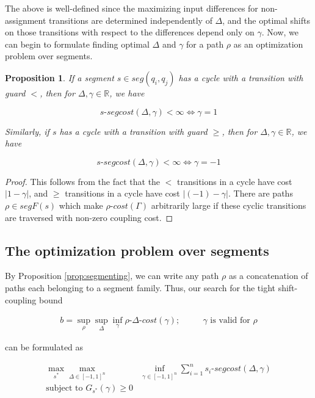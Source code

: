 \documentclass{article}
\newcommand{\R}{\mathbb{R}}
\newtheorem{proposition}{Proposition}[section]
\newcommand{\1}{\langle 1 \rangle}
\newcommand{\2}{\langle 2 \rangle}
\begin{document}
The above is well-defined since the maximizing input differences for non-assignment transitions are determined independently of $\Delta$, and the optimal shifts on those transitions with respect to the differences depend only on $\gamma$. Now, we can begin to formulate finding optimal $\Delta$ and $\gamma$ for a path $\rho$ as an optimization problem over segments.

\begin{proposition}
    If a segment $s \in seg(q_i, q_j)$ has a cycle with a transition with guard $<$, then for $\Delta, \gamma \in \R$, we have 

    \[s\text{-}segcost(\Delta, \gamma) < \infty \iff \gamma = 1 \]

    Similarly, if $s$ has a cycle with a transition with guard $\geq$, then for $\Delta, \gamma \in \R$, we have

    \[s\text{-}segcost(\Delta, \gamma) < \infty \iff \gamma = -1\]
\end{proposition}

\begin{proof}
    This follows from the fact that the $<$ transitions in a cycle have cost $|1 - \gamma|$, and $\geq$ transitions in a cycle have cost $|(-1) - \gamma|$. There are paths $\rho \in segF(s)$ which make $\rho$-$cost(\Gamma)$ arbitrarily large if these cyclic transitions are traversed with non-zero coupling cost.
\end{proof}

\subsection{The optimization problem over segments}

By Proposition \ref{prop:segmenting}, we can write any path $\rho$ as a concatenation of paths each belonging to a segment family. Thus, our search for the tight shift-coupling bound

\begin{align*}
    b = \sup_{\rho} \sup_{\Delta} \inf_{\gamma} \rho\text{-}\Delta\text{-}cost(\gamma) ; \qquad \text{ $\gamma$ is valid for $\rho$}
\end{align*}

can be formulated as 

\begin{align*}
    \max_{s^*} \max_{\Delta \in [-1, 1]^n} &\inf_{\gamma \in [-1, 1]^n} \sum_{i = 1}^n s_i\text{-}segcost(\Delta, \gamma) \\ 
    \text{subject to } G_{s^*}(\gamma) \geq 0
\end{align*}
\end{document}
